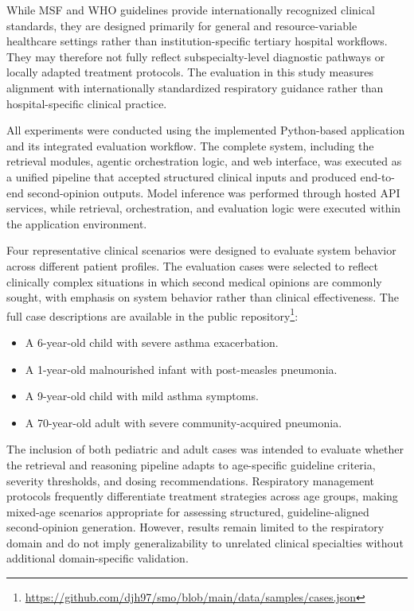 \documentclass[preprint,12pt]{elsarticle}
\begin{document}
While MSF and WHO guidelines provide internationally recognized clinical standards, they are designed primarily for general and resource-variable healthcare settings rather than institution-specific tertiary hospital workflows. They may therefore not fully reflect subspecialty-level diagnostic pathways or locally adapted treatment protocols. The evaluation in this study measures alignment with internationally standardized respiratory guidance rather than hospital-specific clinical practice.

All experiments were conducted using the implemented Python-based application and its integrated evaluation workflow. The complete system, including the retrieval modules, agentic orchestration logic, and web interface, was executed as a unified pipeline that accepted structured clinical inputs and produced end-to-end second-opinion outputs. Model inference was performed through hosted API services, while retrieval, orchestration, and evaluation logic were executed within the application environment.

Four representative clinical scenarios were designed to evaluate system behavior across different patient profiles. The evaluation cases were selected to reflect clinically complex situations in which second medical opinions are commonly sought, with emphasis on system behavior rather than clinical effectiveness. The full case descriptions are available in the public repository\footnote{\url{https://github.com/djh97/smo/blob/main/data/samples/cases.json}}:

\begin{itemize}
    \item A 6-year-old child with severe asthma exacerbation.
    \item A 1-year-old malnourished infant with post-measles pneumonia.
    \item A 9-year-old child with mild asthma symptoms.
    \item A 70-year-old adult with severe community-acquired pneumonia.
\end{itemize}

The inclusion of both pediatric and adult cases was intended to evaluate whether the retrieval and reasoning pipeline adapts to age-specific guideline criteria, severity thresholds, and dosing recommendations. Respiratory management protocols frequently differentiate treatment strategies across age groups, making mixed-age scenarios appropriate for assessing structured, guideline-aligned second-opinion generation. However, results remain limited to the respiratory domain and do not imply generalizability to unrelated clinical specialties without additional domain-specific validation.
\end{document}
